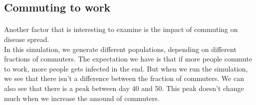 \documentclass[runningheads]{llncs}
\begin{document}
\newpage
\subsection{Commuting to work}

\paragraph{} Another factor that is interesting to examine is the impact of commuting on disease spread. \\
In this simulation, we generate different populations, depending on different fractions of commuters. The expectation we have is that if more people commute to work, more people gets infected in the end. But when we run the simulation, we see that there isn't a difference between the fraction of commuters. We can also see that there is a peak between day 40 and 50. This peak doesn't change much when we increase the amound of commuters. 
\end{document}
